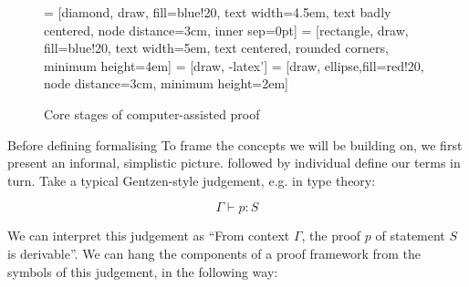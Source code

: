 \documentclass[]{article}
\begin{document}
\begin{figure}
  \centering
   = [diamond, draw, fill=blue!20, text width=4.5em, text badly centered, node distance=3cm, inner sep=0pt]
   = [rectangle, draw, fill=blue!20, text width=5em, text centered, rounded corners, minimum height=4em]
   = [draw, -latex']
   = [draw, ellipse,fill=red!20, node distance=3cm, minimum height=2em]

  \caption{Core stages of computer-assisted proof \label{proofprocess}}
\end{figure}

\iffalse

Before defining formalising To frame the concepts we will be building on, we first present an informal, simplistic picture. followed by individual define our terms in turn. Take a typical Gentzen-style judgement, e.g. in type theory:

\[\Gamma \vdash p : S\]

We can interpret this judgement as ``From context $\Gamma$, the proof $p$ of statement $S$ is derivable''. We can hang the components of a proof framework from the symbols of this judgement, in the following way:
\end{document}
